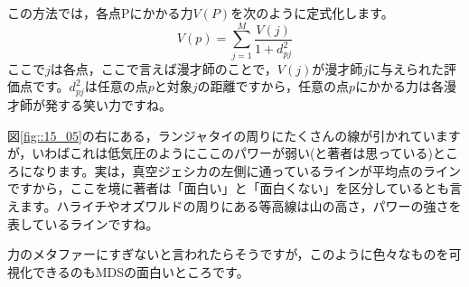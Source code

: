 \documentclass{ltjsbook}
\begin{document}
この方法では，各点Pにかかる力$V(P)$を次のように定式化します。
\[ V(p) = \sum_{j=1}^M \frac{V(j)}{1+d_{pj}^2} \]
ここで$j$は各点，ここで言えば漫才師のことで，$V(j)$が漫才師$j$に与えられた評価点です。$d_{pj}^2$は任意の点$p$と対象$j$の距離ですから，任意の点$p$にかかる力は各漫才師が発する笑い力ですね。

図\ref{fig::15_05}の右にある，ランジャタイの周りにたくさんの線が引かれていますが，いわばこれは低気圧のようにここのパワーが弱い(と著者は思っている)ところになります。実は，真空ジェシカの左側に通っているラインが平均点のラインですから，ここを境に著者は「面白い」と「面白くない」を区分しているとも言えます。ハライチやオズワルドの周りにある等高線は山の高さ，パワーの強さを表しているラインですね。

力のメタファーにすぎないと言われたらそうですが，このように色々なものを可視化できるのもMDSの面白いところです。
\end{document}
